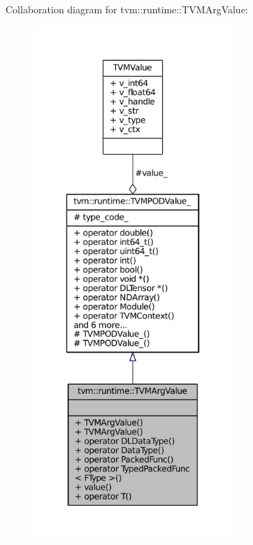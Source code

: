 Collaboration diagram for tvm\+:\+:runtime\+:\+:T\+V\+M\+Arg\+Value\+:
\nopagebreak
\begin{figure}[H]
\begin{center}
\leavevmode
\includegraphics[height=550pt]{classtvm_1_1runtime_1_1TVMArgValue__coll__graph}
\end{center}
\end{figure}
